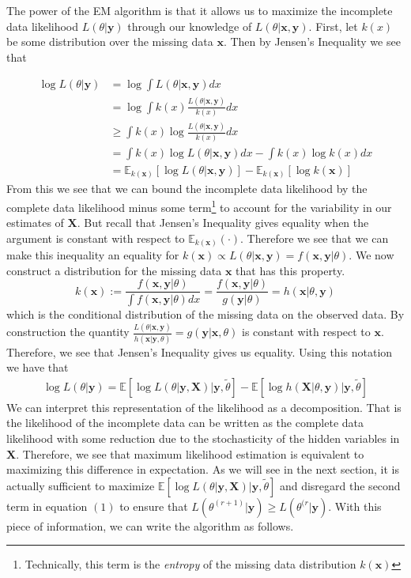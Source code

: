 \documentclass{article}
\newcommand{\E}{{\mathbb{E}}}
\begin{document}
The power of the EM algorithm is that it allows us to maximize the incomplete data likelihood $L(\theta|\mathbf{y})$ through our knowledge of $L(\theta|\mathbf{x}, \mathbf{y})$. First, let $k(x)$ be some distribution over the missing data $\mathbf{x}$. Then by Jensen's Inequality we see that 

\begin{align*}
\log L(\theta|\mathbf{y}) &= \log \int L(\theta|\mathbf{x},\mathbf{y})dx\\
&= \log \int k(x)\frac{L(\theta|\mathbf{x},\mathbf{y})}{k(x)}dx\\
&\geq \int k(x)\log\frac{L(\theta|\mathbf{x},\mathbf{y})}{k(x)}dx\\
&= \int k(x)\log L(\theta|\mathbf{x},\mathbf{y})dx - \int k(x)\log k(x)dx\\
&= \E_{k(\mathbf{x})}[\log L(\theta|\mathbf{x},\mathbf{y})]- \E_{k(\mathbf{x})}[\log k(\mathbf{x})]
\end{align*}
From this we see that we can bound the incomplete data likelihood by the complete data likelihood minus some term\footnote{Technically, this term is the \textit{entropy} of the missing data distribution $k(\mathbf{x})$} to account for the variability in our estimates of $\mathbf{X}$. But recall that Jensen's Inequality gives equality when the argument is constant with respect to $\E_{k(\mathbf{x})}(\cdot)$. Therefore we see that we can make this inequality an equality for $k(\mathbf{x})\propto L(\theta|\mathbf{x}, \mathbf{y}) = f(\mathbf{x},\mathbf{y}|\theta)$. We now construct a distribution for the missing data $\mathbf{x}$ that has this property.
$$k(\mathbf{x}):= \frac{f(\mathbf{x},\mathbf{y}|\theta)}{\int f(\mathbf{x},\mathbf{y}|\theta)dx} = \frac{f(\mathbf{x},\mathbf{y}|\theta)}{g(\mathbf{y}|\theta)} = h(\mathbf{x}|\theta, \mathbf{y})$$ 
which is the conditional distribution of the missing data on the observed data. By construction the quantity $\frac{L(\theta|\mathbf{x},\mathbf{y})}{h(\mathbf{x}|\mathbf{y},\theta)} = g(\mathbf{y}|\mathbf{x},\theta)$ is constant with respect to $\mathbf{x}$. Therefore, we see that Jensen's Inequality gives us equality. Using this notation we have that 
\begin{align}
\log L(\theta|\mathbf{y}) = \E\left[\log L(\theta|\mathbf{y},\mathbf{X})\big|\mathbf{y},\tilde{\theta}\right] - \E\left[\log h(\mathbf{X}|\theta,\mathbf{y})\big| \mathbf{y},\tilde{\theta}\right]
\end{align}
We can interpret this representation of the likelihood as a decomposition. That is the likelihood of the incomplete data can be written as the complete data likelihood with some reduction due to the stochasticity of the hidden variables in $\mathbf{X}$. Therefore, we see that maximum likelihood estimation is equivalent to maximizing this difference in expectation. As we will see in the next section, it is actually sufficient to maximize $\E\left[\log L(\theta|\mathbf{y},\mathbf{X})\big|\mathbf{y},\tilde{\theta}\right]$ and disregard the second term in equation $(1)$ to ensure that $L(\theta^{(r+1)}|\mathbf{y})\geq L(\theta^{(r}|\mathbf{y})$. With this piece of information, we can write the algorithm as follows.
\end{document}
